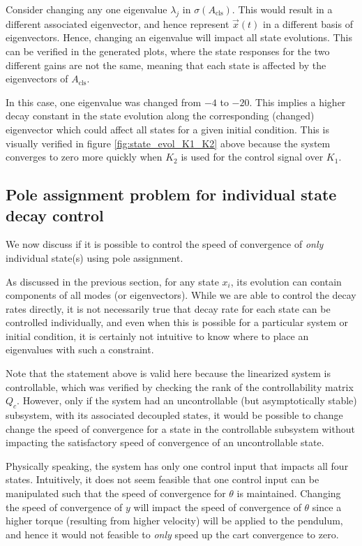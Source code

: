 \documentclass[10pt]{article}
\begin{document}
Consider changing any one eigenvalue $\lambda_j$ in $\sigma(A_\text{cls})$. This would result in a different associated eigenvector, and hence represent $\vec{x}(t)$ in a different basis of eigenvectors. Hence, changing an eigenvalue will impact all state evolutions. This can be verified in the generated plots, where the state responses for the two different gains are not the same, meaning that each state is affected by the eigenvectors of $A_\text{cls}$. 

In this case, one eigenvalue was changed from $-4$ to $-20$. This implies a higher decay constant in the state evolution along the corresponding (changed) eigenvector which could affect all states for a given initial condition. This is visually verified in figure \ref{fig:state_evol_K1_K2} above because the system converges to zero more quickly when $K_2$ is used for the control signal over $K_1$.

\subsection{Pole assignment problem for individual state decay control}
We now discuss if it is possible to control the speed of convergence of \textit{only} individual state(s) using pole assignment. 

As discussed in the previous section, for any state $x_i$, its evolution can contain components of all modes (or eigenvectors). While we are able to control the decay rates directly, it is not necessarily true that decay rate for each state can be controlled individually, and even when this is possible for a particular system or initial condition, it is certainly not intuitive to know where to place an eigenvalues with such a constraint.

Note that the statement above is valid here because the linearized system is controllable, which was verified by checking the rank of the controllability matrix $Q_c$. However, only if the system had an uncontrollable (but asymptotically stable) subsystem, with its associated decoupled states, it would be possible to change change the speed of convergence for a state in the controllable subsystem without impacting the satisfactory speed of convergence of an uncontrollable state. 

Physically speaking, the system has only one control input that impacts all four states. Intuitively, it does not seem feasible that one control input can be manipulated such that the speed of convergence for $\theta$ is maintained. Changing the speed of convergence of $y$ will impact the speed of convergence of $\theta$ since a higher torque (resulting from higher velocity) will be applied to the pendulum, and hence it would not feasible to \textit{only} speed up the cart convergence to zero.
\end{document}
